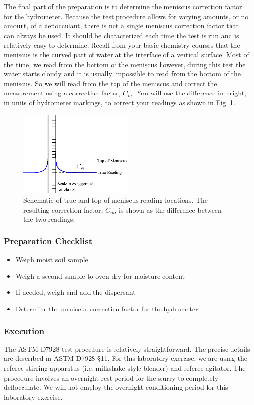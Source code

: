 \documentclass[12pt]{article}
\begin{document}
The final part of the preparation is to determine the meniscus correction factor for the hydrometer. Because the test procedure allows for varying amounts, or no amount, of a deflocculant, there is not a single meniscus correction factor that can always be used. It should be characterized each time the test is run and is relatively easy to determine. Recall from your basic chemistry courses that the meniscus is the curved part of water at the interface of a vertical surface. Most of the time, we read from the bottom of the meniscus however, during this test the water starts cloudy and it is usually impossible to read from the bottom of the meniscus. So we will read from the top of the meniscus and correct the measurement using a correction factor, $C_m$. You will use the difference in height, in units of hydrometer markings, to correct your readings as shown in Fig. \ref{fig:meniscus}.

\begin{figure}[H]
    \centering
    \includegraphics[width=0.5\textwidth]{meniscus.eps}
    \caption{Schematic of true and top of meniscus reading locations. The resulting correction factor, $C_m$, is shown as the difference between the two readings.}
    \label{fig:meniscus}
\end{figure}

\subsubsection*{Preparation Checklist}
\begin{itemize}
    \item Weigh moist soil sample
    \item Weigh a second sample to oven dry for moisture content
    \item If needed, weigh and add the dispersant
    \item Determine the meniscus correction factor for the hydrometer
\end{itemize}

\subsubsection{Execution}
The ASTM D7928 test procedure is relatively straightforward. The precise details are described in ASTM D7928 \S11. For this laboratory exercise, we are using the referee stirring apparatus (i.e. milkshake-style blender) and referee agitator. The procedure involves an overnight rest period for the slurry to completely deflocculate. We will not employ the overnight conditioning period for this laboratory exercise.
\end{document}

